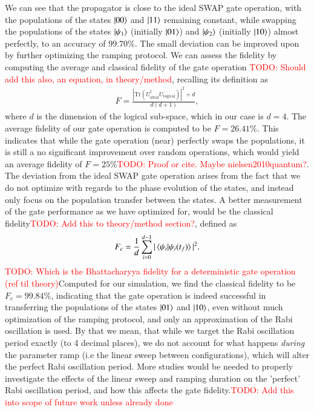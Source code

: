 \documentclass{subfiles}
\begin{document}
We can see that the propagator is close to the ideal SWAP gate operation, with the populations of the states $\ket{00}$ and $\ket{11}$ remaining constant, while swapping the populations of the states $\ket{\psi_1}$  (initially $\ket{01}$) and $\ket{\psi_2}$ (initially $\ket{10}$) almost perfectly, to an accuracy of $99.70\%$. The small deviation can be improved upon by further optimizing the ramping protocol. We can assess the fidelity by computing the average and classical fidelity of the gate operation \textcolor{red}{TODO: Should add this also, an equation, in theory/method}, recalling its definition as
\begin{align*}
    F = \frac{|\text{Tr}(U_{\text{ideal}}^\dagger U_{\text{logical}})|^2 + d}{d(d+1)},
\end{align*}
where $d$ is the dimension of the logical sub-space, which in our case is $d=4$. The average fidelity of our gate operation is computed to be $F = 26.41\%$. This indicates that while the gate operation (near) perfectly swaps the populations, it is still a no significant improvement over random operations, which would yield an average fidelity of $F = 25\%$\textcolor{red}{TODO: Proof or cite. Maybe nielsen2010quantum?}. The deviation from the ideal SWAP gate operation arises from the fact that we do not optimize with regards to the phase evolution of the states, and instead only focus on the population transfer between the states. A better measurement of the gate performance as we have optimized for, would be the classical fidelity\textcolor{red}{TODO: Add this to theory/method section?}, defined as
\begin{align*}
    F_c = \frac{1}{d} \sum_{i=0}^{d-1} |\braket{\psi_i | \psi_i(t_f)}|^2.
\end{align*}
\textcolor{red}{TODO: Which is the Bhattacharyya fidelity for a deterministic gate operation (ref til theory)}Computed for our simulation, we find the classical fidelity to be $F_c = 99.84\%$, indicating that the gate operation is indeed successful in transferring the populations of the states $\ket{01}$ and $\ket{10}$, even without much optimization of the ramping protocol, and only an approximation of the Rabi oscillation is used. By that we mean, that while we target the Rabi oscillation period exactly (to 4 decimal places), we do not account for what happens \emph{during} the parameter ramp (i.e the linear sweep between configurations), which will alter the perfect Rabi oscillation period. More studies would be needed to properly investigate the effects of the linear sweep and ramping duration on the 'perfect' Rabi oscillation period, and how this affects the gate fidelity.\textcolor{red}{TODO: Add this into scope of future work unless already done}
\end{document}
